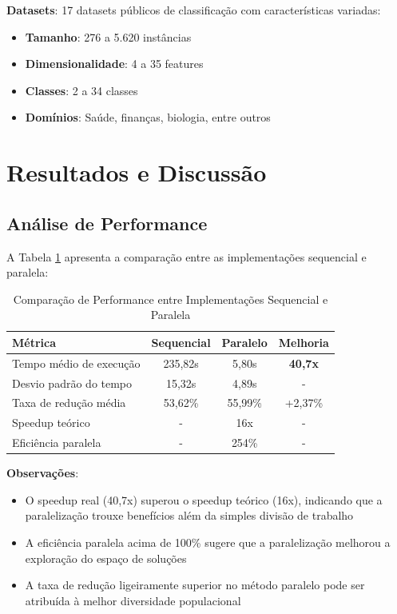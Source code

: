 \documentclass[12pt,a4paper]{article}
\begin{document}
\textbf{Datasets}: 17 datasets públicos de classificação com características variadas:
\begin{itemize}
    \item \textbf{Tamanho}: 276 a 5.620 instâncias
    \item \textbf{Dimensionalidade}: 4 a 35 features
    \item \textbf{Classes}: 2 a 34 classes
    \item \textbf{Domínios}: Saúde, finanças, biologia, entre outros
\end{itemize}

\section{Resultados e Discussão}

\subsection{Análise de Performance}

A Tabela \ref{tab:performance} apresenta a comparação entre as implementações sequencial e paralela:

\begin{table}[H]
\centering
\caption{Comparação de Performance entre Implementações Sequencial e Paralela}
\label{tab:performance}
\begin{tabular}{lccc}
\toprule
\textbf{Métrica} & \textbf{Sequencial} & \textbf{Paralelo} & \textbf{Melhoria} \\
\midrule
Tempo médio de execução & 235,82s & 5,80s & \textbf{40,7x} \\
Desvio padrão do tempo & 15,32s & 4,89s & - \\
Taxa de redução média & 53,62\% & 55,99\% & +2,37\% \\
Speedup teórico & - & 16x & - \\
Eficiência paralela & - & 254\% & - \\
\bottomrule
\end{tabular}
\end{table}

\textbf{Observações}:
\begin{itemize}
    \item O speedup real (40,7x) superou o speedup teórico (16x), indicando que a paralelização trouxe benefícios além da simples divisão de trabalho
    \item A eficiência paralela acima de 100\% sugere que a paralelização melhorou a exploração do espaço de soluções
    \item A taxa de redução ligeiramente superior no método paralelo pode ser atribuída à melhor diversidade populacional
\end{itemize}
\end{document}
